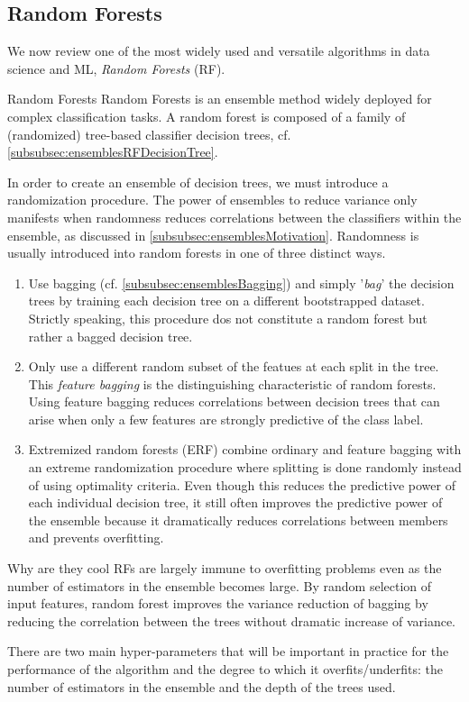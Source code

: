 \subsection{Random Forests}
\label{subsec:ensemblesRandomForest}
We now review one of the most widely used and versatile algorithms in data science and ML, \emph{Random Forests} (RF).
\begin{mybox}{Random Forests}
	Random Forests is an ensemble method widely deployed for complex classification tasks. A random forest is composed of a family of (randomized) tree-based classifier decision trees, cf. \ref{subsubsec:ensemblesRFDecisionTree}.
\end{mybox}
In order to create an ensemble of decision trees, we must introduce a randomization procedure. The power of ensembles to reduce variance only manifests when randomness reduces correlations between the classifiers within the ensemble, as discussed in \ref{subsubsec:ensemblesMotivation}. Randomness is usually introduced into random forests in one of three distinct ways.
\begin{enumerate}
	\item Use bagging (cf. \ref{subsubsec:ensemblesBagging}) and simply ’\emph{bag}’ the decision trees by training each decision tree on a different bootstrapped dataset. Strictly speaking, this procedure dos not constitute a random forest but rather a bagged decision tree.
	\item Only use a different random subset of the featues at each split in the tree. This \emph{feature bagging} is the distinguishing characteristic of random forests. Using feature bagging reduces correlations between decision trees that can arise when only a few features are strongly predictive of the class label. 
	\item Extremized random forests (ERF) combine ordinary and feature bagging with an extreme randomization procedure where splitting is done randomly instead of using optimality criteria. Even though this reduces the predictive power of each individual decision tree, it still often improves the predictive power of the ensemble because it dramatically reduces correlations between members and prevents overfitting.
\end{enumerate}
\begin{mybox}{Why are they cool}
	RFs are largely immune to overfitting problems even as the number of estimators in the ensemble becomes large. By random selection of input features, random forest improves the variance reduction of bagging by reducing the correlation between the trees without dramatic increase of variance.
\end{mybox}
There are two main hyper-parameters that will be important in practice for the performance of the algorithm and the degree to which it overfits/underfits: the number of estimators in the ensemble and the depth of the trees used. 














